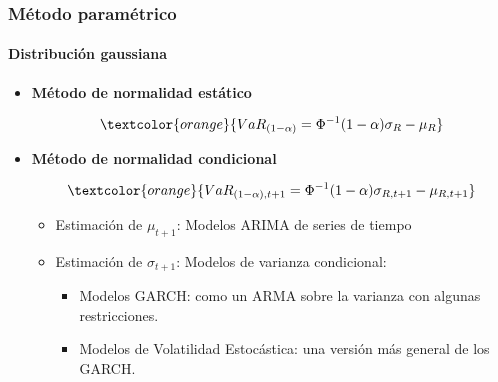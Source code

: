 \documentclass[aspectratio=169]{beamer}
\begin{document}



\begin{frame}
\frametitle{Método paramétrico}
\framesubtitle{Distribución gaussiana}



\begin{itemize}
\item \textbf{Método de normalidad estático}

\begin{equation}
\textcolor{orange}{VaR_{(1-\alpha)} = \Phi^{-1}(1-\alpha) \sigma_R - \mu_R}  \nonumber
\end{equation}


\vspace{4mm}

\item \textbf{Método de normalidad condicional}


\begin{equation}
\textcolor{orange}{VaR_{(1-\alpha),t+1} = \Phi^{-1}(1-\alpha) \sigma_{R,t+1} - \mu_{R,t+1}}  \nonumber
\end{equation}

\begin{itemize}
\item Estimación de $\mu_{t+1}$: Modelos ARIMA de series de tiempo
\item Estimación de $\sigma_{t+1}$: Modelos de varianza condicional:

\begin{itemize}
\item Modelos GARCH: como un ARMA sobre la varianza con algunas restricciones.
\item Modelos de Volatilidad Estocástica: una versión más general de los GARCH.
\end{itemize}
\end{itemize}

\end{itemize}



\end{frame}



\end{document}
